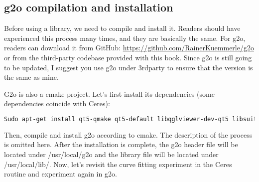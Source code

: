 \subsection{g2o compilation and installation}

Before using a library, we need to compile and install it. Readers should have experienced this process many times, and they are basically the same. For g2o, readers can download it from GitHub: \url{https://github.com/RainerKuemmerle/g2o} or from the third-party codebase provided with this book. Since g2o is still going to be updated, I suggest you use g2o under 3rdparty to ensure that the version is the same as mine.

G2o is also a cmake project. Let's first install its dependencies (some dependencies coincide with Ceres):

\begin{lstlisting}[language=sh,caption=terminal input:]
Sudo apt-get install qt5-qmake qt5-default libqglviewer-dev-qt5 libsuitesparse-dev libcxsparse3 libcholmod3
\end{lstlisting}

Then, compile and install g2o according to cmake. The description of the process is omitted here. After the installation is complete, the g2o header file will be located under /usr/local/g2o and the library file will be located under /usr/local/lib/. Now, let's revisit the curve fitting experiment in the Ceres routine and experiment again in g2o.